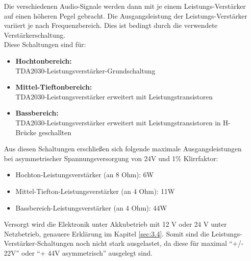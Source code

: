 Die verschiedenen Audio-Signale werden dann mit je einem Leistungs-Verstärker auf einen höheren Pegel gebracht.
Die Ausgangsleistung der Leistungs-Verstärker variiert je nach Frequenzbereich.
Dies ist bedingt durch die verwendete Verstärkerschaltung.\\
Diese Schaltungen sind für:
\begin{itemize}
	\item \textbf{Hochtonbereich:}\\ TDA2030-Leistungsverstärker-Grundschaltung
	\item \textbf{Mittel-Tieftonbereich:}\\ TDA2030-Leistungsverstärker erweitert mit Leistungstransistoren
	\item \textbf{Bassbereich:}\\ TDA2030-Leistungsverstärker erweitert mit Leistungstransistoren in H-Brücke geschallten
\end{itemize}
Aus diesen Schaltungen erschließen sich folgende maximale Ausgangsleistungen bei asymmetrischer Spannungsversorgung von 24V und 1\% Klirrfaktor:\\
\begin{itemize}
	\item Hochton-Leistungsverstärker (an 8 Ohm): 6W
	\item Mittel-Tiefton-Leistungsverstärker (an 4 Ohm): 11W
	\item Bassbereich-Leistungsverstärker (an 4 Ohm): 44W
\end{itemize}

Versorgt wird die Elektronik unter Akkubetrieb mit 12 V oder 24 V unter Netzbetrieb, genauere Erklärung im Kapitel \ref{sec:3.4}.
Somit sind die Leistungs-Verstärker-Schaltungen noch nicht stark ausgelastet, da diese für maximal \enquote{+/- 22V} oder \enquote{+ 44V asymmetrisch} ausgelegt sind.


\newpage
